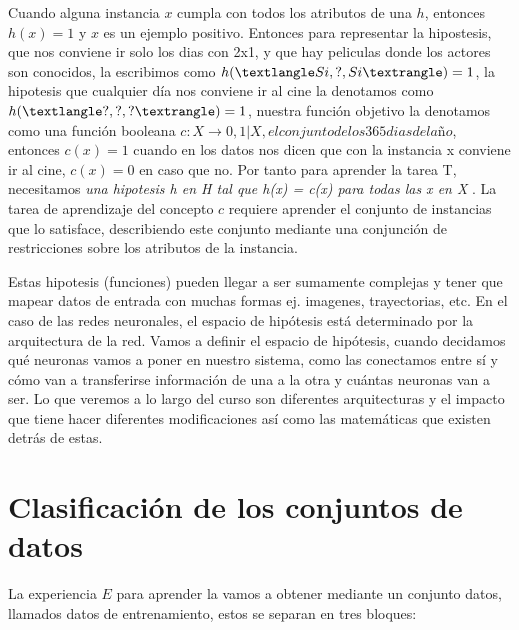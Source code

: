 Cuando alguna instancia $x$ cumpla con todos los atributos de una \(h\), entonces \(h(x) = 1 \) y $x$ es un ejemplo positivo. Entonces para representar la hipostesis, que nos conviene ir solo los dias con 2x1, y que hay peliculas donde los actores son conocidos, la escribimos como $h(\textlangle Si, ?, Si\textrangle) = 1 $, la hipotesis que cualquier día nos conviene ir al cine la denotamos como $h(\textlangle ?, ?, ?\textrangle) = 1 $, nuestra función objetivo la denotamos como una función booleana $c:X \rightarrow {0,1} | X, el conjunto de los 365 dias del año$, entonces $c(x) = 1$ cuando en los datos nos dicen que con la instancia x conviene ir al cine, $c(x) = 0$ en caso que no. Por tanto para aprender la tarea T, necesitamos \emph{una hipotesis h en H tal que h(x) = c(x) para todas las x en X }. La tarea de aprendizaje del concepto $c$ requiere aprender el conjunto de instancias que lo satisface, describiendo este conjunto mediante una conjunción de restricciones sobre los atributos de la instancia.  

Estas hipotesis (funciones) pueden llegar a ser sumamente complejas y tener que mapear datos de entrada con muchas formas ej. imagenes, trayectorias, etc. En el caso de las redes neuronales, el espacio de hipótesis está determinado por la arquitectura de la red.
Vamos a definir el espacio de hipótesis, cuando decidamos qué neuronas vamos a poner en nuestro sistema, como las conectamos entre sí y cómo van a transferirse información de una a la otra y cuántas neuronas van a ser. Lo que veremos a lo largo del curso son diferentes arquitecturas y el impacto que tiene hacer diferentes modificaciones así como las matemáticas que existen detrás de estas. 

\section{Clasificación de los conjuntos de datos}

La experiencia \(E\) para aprender la vamos a obtener mediante un conjunto datos, llamados datos de entrenamiento, estos se separan en tres bloques:

